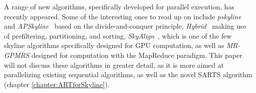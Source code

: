 A range of new algorithms, specifically developed for parallel execution, has recently appeared. Some of the interesting ones to read up on include \textit{pskyline}~\cite{parallel-bbs} and \textit{APSkyline}~\cite{apskyline} based on the divide-and-conquer principle, \textit{Hybrid}~\cite{chester} making use of prefiltering, partitioning, and sorting, \textit{SkyAlign}~\cite{skyalign}, which is one of the few skyline algorithms specifically designed for GPU computation, as well as \textit{MR-GPMRS} \cite{map-reduce} designed for computation with the MapReduce paradigm. This paper will not discuss these algorithms in greater detail, as it is more aimed at parallelizing existing sequential algorithms, as well as the novel SARTS algorithm (chapter \ref{chapter:ARTforSkyline}). 





